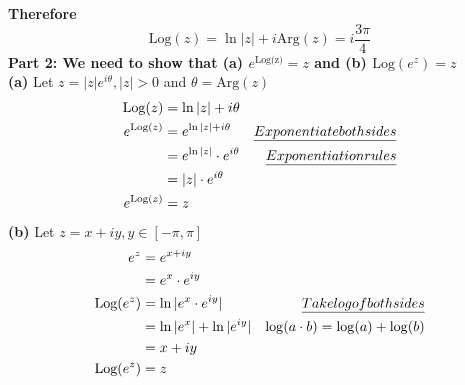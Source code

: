 \documentclass[a4paper, 8pt]{extarticle}
\begin{document}
\begin{examplebox}[Calculate the principal value Log($z$) of $z = -\frac{1}{\sqrt{2}} + \frac{1}{\sqrt{2}}i$ and prove $e^z$ is the inverse function of Log($z$)]
\begin{minipage}{0.5\textwidth}
\begin{center}
		\end{center}
	\end{minipage}
	\textbf{Therefore}
	$$
		\text{Log}(z) = \ln|z| + i\text{Arg}(z) = i\frac{3\pi}{4}
	$$
	\textbf{Part 2: We need to show that (a) $e^{\text{Log(z)}} = z$ and (b) $\text{Log}(e^z) = z$} \\
	\textbf{(a)} Let $z = |z| e^{i \theta}, |z| > 0$ and $\theta = \text{Arg}(z)$
	\begin{align*}
		\text{Log}(z)     & = \ln|z| + i \theta                                             \\
		e^{\text{Log}(z)} & = e^{\ln|z| + i\theta}         & \emph{Exponentiate both sides} \\
		                  & = e^{\ln|z|} \cdot e^{i\theta} & \emph{Exponentiation rules}    \\
		                  & = |z| \cdot e^{i\theta}                                         \\
		e^{\text{Log}(z)} & = z
	\end{align*}
	\textbf{(b)} Let $z = x+iy, y \in [-\pi, \pi]$
	\begin{align*}
		e^z             & = e^{x+iy}                                                     \\
		                & = e^x \cdot e^{iy}                                             \\
		\text{Log}(e^z) & = \ln|e^x \cdot e^{iy}|  & \emph{Take log of both sides}       \\
		                & = \ln|e^x| + \ln|e^{iy}| & \log(a \cdot b) = \log(a) + \log(b) \\
		                & = x + iy                                                       \\
		\text{Log}(e^z) & = z
	\end{align*}
\end{examplebox}
\end{document}
